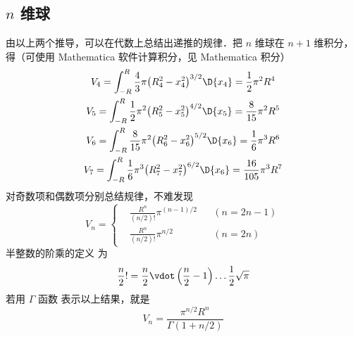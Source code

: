 \subsection{ $n$ 维球}
由以上两个推导，可以在代数上总结出递推的规律．把 $n$ 维球在 $n+1$ 维积分，得（可使用  Mathematica 软件计算积分，见 Mathematica 积分）%
\begin{gather}
{V_4} = \int_{ - R}^R {\frac{4}{3}\pi {{\left( {R_4^2 - x_4^2} \right)}^{3/2}}\D {x_4}}  = \frac{1}{2}{\pi ^2}{R^4}\\
%
{V_5} = \int_{ - R}^R {\frac{1}{2}{\pi ^2}{{\left( {R_5^2 - x_5^2} \right)}^{4/2}}\D {x_5}}  = \frac{8}{{15}}{\pi ^2}{R^5}\\
%
{V_6} = \int_{ - R}^R {\frac{8}{{15}}{\pi ^2}{{\left( {R_6^2 - x_6^2} \right)}^{5/2}}\D {x_6}}  = \frac{1}{6}{\pi ^3}{R^6}\\
%
{V_7} = \int_{ - R}^R {\frac{1}{6}{\pi ^3}{{\left( {R_7^2 - x_7^2} \right)}^{6/2}}\D {x_6}}  = \frac{{16}}{{105}}{\pi ^3}{R^7}
\end{gather}
对奇数项和偶数项分别总结规律，不难发现
\begin{equation}
{V_n} = \left\{ \begin{aligned}
&\frac{R^n}{(n/2)!} \pi ^{(n - 1)/2} &&(n= 2n - 1)\\
&\frac{R^n}{(n/2)!} \pi ^{n/2} &&(n=2n)
\end{aligned} \right.
\end{equation}
半整数的阶乘的定义 为
\begin{equation}
\frac{n}{2}! = \frac{n}{2} \vdot \left(\frac{n}{2}-1\right)\dots\frac{1}{2}\sqrt{\pi}
\end{equation}
若用 $\Gamma $ 函数 表示以上结果，就是
\begin{equation}
{V_n} = \frac{\pi ^{n/2}{R^n}}{\Gamma (1 + n/2)}
\end{equation}








